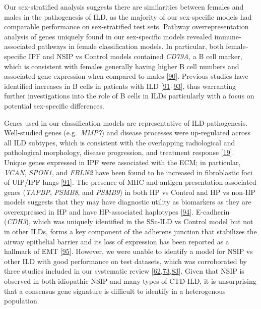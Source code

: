 \documentclass[
]{article}
\begin{document}
Our sex-stratified analysis suggests there are similarities between females and males in the pathogenesis of ILD, as the majority of our sex-specific models had comparable performance on sex-stratified test sets. Pathway overrepresentation analysis of genes uniquely found in our sex-specific models revealed immune-associated pathways in female classification models. In particular, both female-specific IPF and NSIP vs Control models contained \textit{CD79A}, a B cell marker, which is consistent with females generally having higher B cell numbers and associated gene expression when compared to males {[}\protect\hyperlink{ref-klein_sex_2016}{90}{]}. Previous studies have identified increases in B cells in patients with ILD {[}\protect\hyperlink{ref-herrera_uipipf_2022}{91}--\protect\hyperlink{ref-schiller_deep_2017}{93}{]}, thus warranting further investigations into the role of B cells in ILDs particularly with a focus on potential sex-specific differences.

Genes used in our classification models are representative of ILD pathogenesis. Well-studied genes (e.g.~\textit{MMP7}) and disease processes were up-regulated across all ILD subtypes, which is consistent with the overlapping radiological and pathological morphology, disease progression, and treatment response {[}\protect\hyperlink{ref-flaherty_nintedanib_2019}{19}{]}. Unique genes expressed in IPF were associated with the ECM; in particular, \textit{VCAN}, \textit{SPON1}, and \textit{FBLN2} have been found to be increased in fibroblastic foci of UIP/IPF lungs {[}\protect\hyperlink{ref-herrera_uipipf_2022}{91}{]}. The presence of MHC and antigen presentation-associated genes (\textit{TAPBP}, \textit{PSMB8}, and \textit{PSMB9}) in both HP vs Control and HP vs non-HP models suggests that they may have diagnostic utility as biomarkers as they are overexpressed in HP and have HP-associated haplotypes {[}\protect\hyperlink{ref-camarena_psmb8_2010}{94}{]}. E-cadherin (\textit{CDH3}), which was uniquely identified in the SSc-ILD vs Control model but not in other ILDs, forms a key component of the adherens junction that stabilizes the airway epithelial barrier and its loss of expression has been reported as a hallmark of EMT {[}\protect\hyperlink{ref-bartis_epithelialmesenchymal_2014}{95}{]}. However, we were unable to identify a model for NSIP vs other ILD with good performance on test datasets, which was corroborated by three studies included in our systematic review {[}\protect\hyperlink{ref-cho_systems_2011}{62},\protect\hyperlink{ref-yang_gene_2007}{73},\protect\hyperlink{ref-horimasu_gene_2017}{83}{]}. Given that NSIP is observed in both idiopathic NSIP and many types of CTD-ILD, it is unsurprising that a consensus gene signature is difficult to identify in a heterogenous population.
\end{document}

